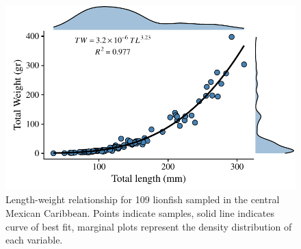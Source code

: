 \documentclass[fleqn,10pt,lineno]{wlpeerj} %
\begin{document}
\begin{figure}
\centering
\includegraphics{Manuscript_files/figure-latex/unnamed-chunk-4-1.pdf}
\caption{\label{fig:l-w-carib}Length-weight relationship for 109
lionfish sampled in the central Mexican Caribbean. Points indicate
samples, solid line indicates curve of best fit, marginal plots
represent the density distribution of each variable.}
\end{figure}
\end{document}
